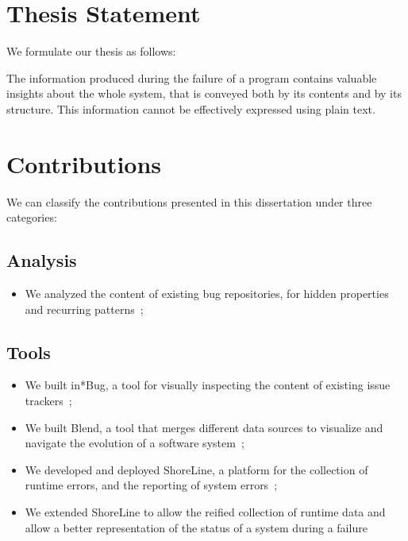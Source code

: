 

\section{Thesis Statement}\label{sec:thesis}

We formulate our thesis as follows:

\begin{framed}
The information produced during the failure of a program contains valuable insights about the whole system, that is conveyed both by its contents and by its structure.
This information cannot be effectively expressed using plain text.
\end{framed}


\section{Contributions}

We can classify the contributions presented in this dissertation under three categories:

\subsection{Analysis}

\begin{itemize}
  \item We analyzed the content of existing bug repositories, for hidden properties and recurring patterns~\cite{DalS2013a,DalS2016a};

\end{itemize}


\subsection{Tools}

\begin{itemize}

    \item We built in*Bug, a tool for visually inspecting the content of existing issue trackers~\cite{DalS2013a,DalS2014a};

    \item We built Blend, a tool that merges different data sources to visualize and navigate the evolution of a software system~\cite{DalS2015b};

    \item We developed and deployed ShoreLine, a platform for the collection of runtime errors, and the reporting of system errors~\cite{DalS2015a};

    \item We extended ShoreLine to allow the reified collection of runtime data and allow a better representation of the status of a system during a failure~\cite{DalS2017b}

\end{itemize}

